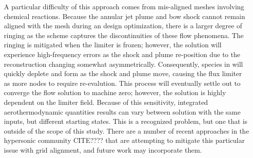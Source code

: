 A particular difficulty of this approach comes from mis-aligned meshes involving
chemical reactions.  Because the annular jet plume and bow shock cannot remain
aligned with the mesh during an design optimization, there is a larger degree of
ringing as the scheme captures the discontinuities of these flow phenomena.  The
ringing is mitigated when the limiter is frozen; however, the solution will
experience high-frequency errors as the shock and plume re-position due to the
reconstruction changing somewhat asymmetrically.  Consequently, species in will
quickly deplete and form as the shock and plume move, causing the flux limiter
as more nodes to require re-evalution.  This process will eventually settle out
to converge the flow solution to machine zero; however, the solution is highly
dependent on the limiter field.  Because of this sensitivity, integrated
aerothermodynamic quantities results can vary between solution with the same
inputs, but different starting states.  This is a recognized problem, but one
that is outside of the scope of this study.  There are a number of recent
approaches in the hypersonic community CITE???? that are attempting to mitigate this
particular issue with grid alignment, and future work may incorporate them.
